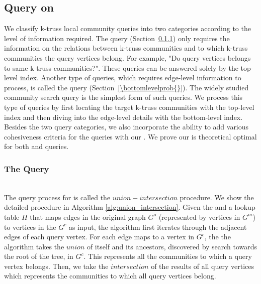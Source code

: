 \subsection{Query on \TwoLevelIndex{}}
\label{query}
We classify k-truss local community queries into two categories according to the level of information required. The \toplevelprob{} query (Section~\ref{\toplevelprob{}}) only requires the information on the relations between k-truss communities and to which k-truss communities the query vertices belong. For example, "Do query vertices belongs to same k-truss communities?". These queries can be answered solely by the top-level index. Another type of queries, which requires edge-level information to process, is called the \bottomlevelprob{} query (Section~\ref{\bottomlevelprob{}}). The widely studied community search query is the simplest form of such queries. We process this type of queries by first locating the target k-truss communities with the top-level index and then diving into the edge-level details with the bottom-level index. Besides the two query categories, we also incorporate the ability to add various cohesiveness criteria for the queries with our \twolevelindex{}. We prove our \twolevelindex{} is theoretical optimal for both \toplevelprob{} and \bottomlevelprob{} queries.

\subsubsection{The \TopLevelProb{} Query}
\label{\toplevelprob{}}

~\\The query process for \toplevelprob{} \probdef{} is called the $union-intersection$ procedure. We show the detailed procedure in Algorithm \ref{alg:union_intersection}. Given the \twolevelindex{} and a lookup table $H$ that maps edges in the original graph $G^o$ (represented by vertices in $G^m$) to vertices in the \treeindex{} $G^c$ as input, the algorithm first iterates through the adjacent edges of each query vertex. For each edge maps to a vertex in $G^c$, the the algorithm takes the $union$ of itself and its ancestors, discovered by search towards the root of the tree, in $G^c$. This represents all the communities to which a query vertex belongs. Then, we take the $intersection$ of the results of all query vertices which represents the communities to which all query vertices belong. 

